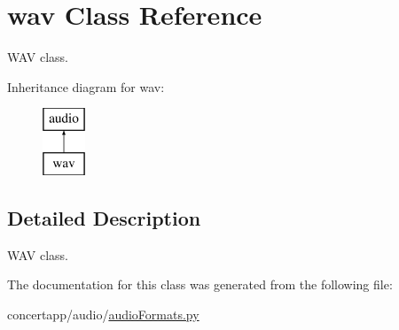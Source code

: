 \hypertarget{classwav}{
\section{wav Class Reference}
\label{classwav}
}


WAV class.  


Inheritance diagram for wav:\begin{figure}[H]
\begin{center}
\leavevmode
\includegraphics[height=2.000000cm]{classwav}
\end{center}
\end{figure}


\subsection{Detailed Description}
WAV class. 

The documentation for this class was generated from the following file:\begin{DoxyCompactItemize}
\item 
concertapp/audio/\hyperlink{audio_formats_8py}{audioFormats.py}\end{DoxyCompactItemize}
